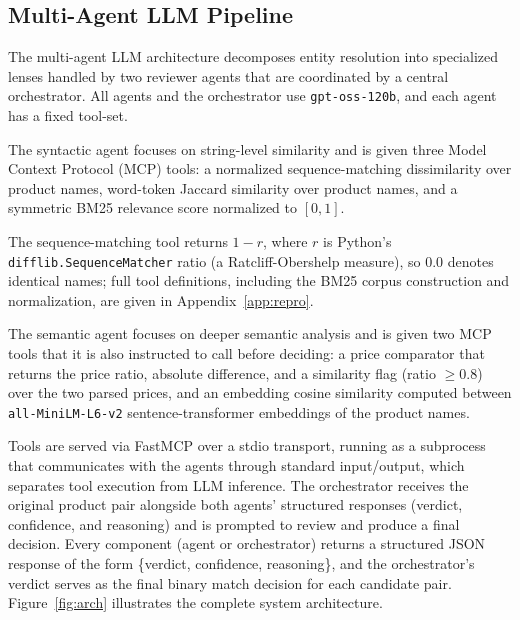 \documentclass[sigconf]{acmart}
\begin{document}
\subsection{Multi-Agent LLM Pipeline}
The multi-agent LLM architecture decomposes entity resolution into specialized lenses handled by two reviewer agents that are coordinated by a central orchestrator.
All agents and the orchestrator use \texttt{gpt-oss-120b}, and each agent has a fixed tool-set.

The syntactic agent focuses on string-level similarity and is given three Model Context Protocol (MCP) tools: a normalized sequence-matching dissimilarity over product names, word-token Jaccard similarity over product names, and a symmetric BM25 relevance score normalized to $[0, 1]$.

The sequence-matching tool returns $1 - r$, where $r$ is Python's \texttt{difflib.SequenceMatcher} ratio (a Ratcliff-Obershelp measure), so 0.0 denotes identical names; full tool definitions, including the BM25 corpus construction and normalization, are given in Appendix~\ref{app:repro}.

The semantic agent focuses on deeper semantic analysis and is given two MCP tools that it is also instructed to call before deciding: a price comparator that returns the price ratio, absolute difference, and a similarity flag (ratio $\geq 0.8$) over the two parsed prices, and an embedding cosine similarity computed between \texttt{all-MiniLM-L6-v2} sentence-transformer embeddings of the product names.

Tools are served via FastMCP over a stdio transport, running as a subprocess that communicates with the agents through standard input/output, which separates tool execution from LLM inference.
The orchestrator receives the original product pair alongside both agents' structured responses (verdict, confidence, and reasoning) and is prompted to review and produce a final decision.
Every component (agent or orchestrator) returns a structured JSON response of the form \{verdict, confidence, reasoning\}, and the orchestrator's verdict serves as the final binary match decision for each
candidate pair.
Figure~\ref{fig:arch} illustrates the complete system architecture.
\end{document}

